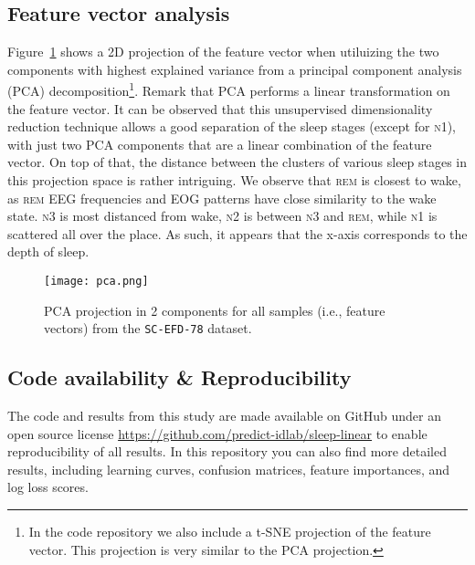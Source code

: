 \documentclass[runningheads]{llncs}
\begin{document}
\subsection{Feature vector analysis}

Figure~\ref{fig:pca} shows a 2D projection of the feature vector when utiluizing the two components with highest explained variance from a principal component analysis (PCA) decomposition\footnote{In the code repository we also include a t-SNE projection of the feature vector. This projection is very similar to the PCA projection.}. Remark that PCA performs a linear transformation on the feature vector. It can be observed that this unsupervised dimensionality reduction technique allows a good separation of the sleep stages (except for \textsc{n1}), with just two PCA components that are a linear combination of the feature vector. On top of that, the distance between the clusters of various sleep stages in this projection space is rather intriguing. We observe that \textsc{rem} is closest to wake, as \textsc{rem} EEG frequencies and EOG patterns have close similarity to the wake state. \textsc{n3} is most distanced from wake, \textsc{n2} is between \textsc{n3} and \textsc{rem}, while \textsc{n1} is scattered all over the place. As such, it appears that the x-axis corresponds to the depth of sleep. 

\begin{figure}[htbp]
    \centering
    \texttt{[image: pca.png]}
    \caption{PCA projection in 2 components for all samples (i.e., feature vectors) from the \texttt{SC-EFD-78} dataset.}
    \label{fig:pca}
\end{figure}

\subsection{Code availability \& Reproducibility}
The code and results from this study are made available on GitHub under an open source license \url{https://github.com/predict-idlab/sleep-linear} to enable reproducibility of all results. In this repository you can also find more detailed results, including learning curves, confusion matrices, feature importances, and log loss scores.
\end{document}
